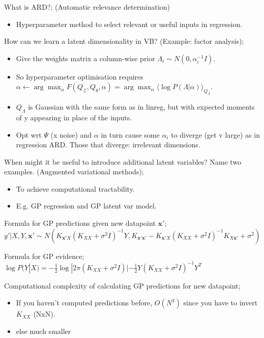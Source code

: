 \documentclass{article}
\begin{document}
What is ARD?; (Automatic relevance determination) \begin{itemize} \item Hyperparameter method to select relevant or useful inputs in regression.  \end{itemize} 

How can we learn a latent dimensionality in VB? (Example: factor analysis); \begin{itemize} \item Give the weights matrix a column-wise prior $\Lambda_i \sim N(0, \alpha_i^{-1}I)$.  \item So hyperparameter optimisation requires $\alpha \leftarrow \arg\max_{\alpha} F(Q_\mathcal{Z}, Q_\theta, \alpha) = \arg\max_\alpha \langle \log P(\Lambda |\alpha)\rangle_{Q_\Lambda}$.  \item $Q_\Lambda$ is Gaussian with the same form as in linreg, but with expected moments of y appearing in place of the inputs.  \item Opt wrt $\Psi$ (x noise) and $\alpha$ in turn cause some $\alpha_i$ to diverge (get v large) as in regression ARD. Those that diverge: irrelevant dimensions.  \end{itemize}

When might it be useful to introduce additional latent variables? Name two examples. (Augmented variational methods); \begin{itemize} \item To achieve computational tractability.  \item E.g. GP regression and GP latent var model.  \end{itemize}


Formula for GP predictions given new datapoint $\mathbf{x'}$; $y'|X, Y, \mathbf{x'} \sim N(K_{\mathbf{x'}X}(K_{XX}+\sigma^2I)^{-1}Y, K_{\mathbf{x'x'}}-K_{\mathbf{x'}X}(K_{XX}+\sigma^2I)^{-1}K_{X\mathbf{x'}}+\sigma^2)$

Formula for GP evidence; $\log P(Y|X) = -\frac{1}{2}\log|2\pi(K_{XX}+\sigma^2I)|-\frac{1}{2}Y(K_{XX}+\sigma^2I)^{-1}Y^T$ 

Computational complexity of calculating GP predictions for new datapoint; \begin{itemize} \item If you haven't computed predictions before, $O(N^3)$ since you have to invert $K_{XX}$ (NxN). \item else much smaller \end{itemize}
\end{document}
